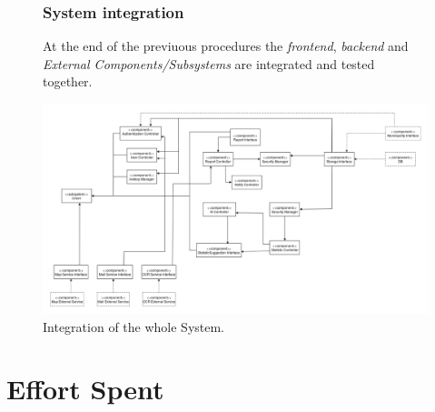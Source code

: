\documentclass{report}
\begin{document}
\begin{figure}[!ht]
    \subsection{System integration}
At the end of the previuous procedures the \textit{frontend}, \textit{backend} and \textit{External Components/Subsystems} are integrated and tested together.
\vspace{1cm}    
\begin{center}
	\includegraphics[width=\textwidth]{img/SystemSub.png}
    \end{center}
    \label{fig:SysSub}
	\caption{Integration of the whole System.}
\end{figure}

\chapter{Effort Spent}
\end{document}
